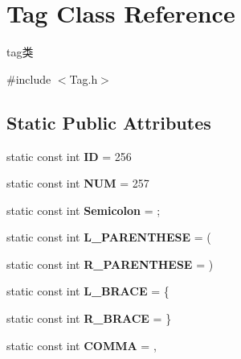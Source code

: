 \hypertarget{class_tag}{}\section{Tag Class Reference}
\label{class_tag}


tag类  




{\ttfamily \#include $<$Tag.\+h$>$}

\subsection*{Static Public Attributes}
\begin{DoxyCompactItemize}
\item 
\mbox{\label{class_tag_acdf9d38c11c7dff1026caea53454d62c}} 
static const int {\bfseries ID} = 256
\item 
\mbox{\label{class_tag_a37bd7cc8cc362fca325f553b2844d745}} 
static const int {\bfseries N\+UM} = 257
\item 
\mbox{\label{class_tag_a383b3b3d27ad94992a9345cf51632f31}} 
static const int {\bfseries Semicolon} = \textquotesingle{};\textquotesingle{}
\item 
\mbox{\label{class_tag_a3f592bff8a566859e6953cd380e809e7}} 
static const int {\bfseries L\+\_\+\+P\+A\+R\+E\+N\+T\+H\+E\+SE} = \textquotesingle{}(\textquotesingle{}
\item 
\mbox{\label{class_tag_a06f70b28d8eb3e9f3d2d7dcc6a318fee}} 
static const int {\bfseries R\+\_\+\+P\+A\+R\+E\+N\+T\+H\+E\+SE} = \textquotesingle{})\textquotesingle{}
\item 
\mbox{\label{class_tag_a27f8b6e653f63d5a04cbf773d7aef40d}} 
static const int {\bfseries L\+\_\+\+B\+R\+A\+CE} = \textquotesingle{}\{\textquotesingle{}
\item 
\mbox{\label{class_tag_ac75cf51168e5f889ec56a8e5cebc4483}} 
static const int {\bfseries R\+\_\+\+B\+R\+A\+CE} = \textquotesingle{}\}\textquotesingle{}
\item 
\mbox{\label{class_tag_ad0218cdf6f9bc11b27aa07dc789e0a2c}} 
static const int {\bfseries C\+O\+M\+MA} = \textquotesingle{},\textquotesingle{}

\end{DoxyCompactItemize}
